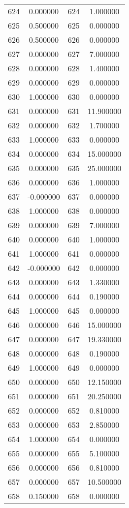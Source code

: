 \documentclass[12pt]{article}
\begin{document}
\begin{longtable}{@{}cccc@{}}
624 & 0.000000 & 624 & 1.000000 \\
625 & 0.500000 & 625 & 0.000000 \\
626 & 0.500000 & 626 & 0.000000 \\
627 & 0.000000 & 627 & 7.000000 \\
628 & 0.000000 & 628 & 1.400000 \\
629 & 0.000000 & 629 & 0.000000 \\
630 & 1.000000 & 630 & 0.000000 \\
631 & 0.000000 & 631 & 11.900000 \\
632 & 0.000000 & 632 & 1.700000 \\
633 & 1.000000 & 633 & 0.000000 \\
634 & 0.000000 & 634 & 15.000000 \\
635 & 0.000000 & 635 & 25.000000 \\
636 & 0.000000 & 636 & 1.000000 \\
637 & -0.000000 & 637 & 0.000000 \\
638 & 1.000000 & 638 & 0.000000 \\
639 & 0.000000 & 639 & 7.000000 \\
640 & 0.000000 & 640 & 1.000000 \\
641 & 1.000000 & 641 & 0.000000 \\
642 & -0.000000 & 642 & 0.000000 \\
643 & 0.000000 & 643 & 1.330000 \\
644 & 0.000000 & 644 & 0.190000 \\
645 & 1.000000 & 645 & 0.000000 \\
646 & 0.000000 & 646 & 15.000000 \\
647 & 0.000000 & 647 & 19.330000 \\
648 & 0.000000 & 648 & 0.190000 \\
649 & 1.000000 & 649 & 0.000000 \\
650 & 0.000000 & 650 & 12.150000 \\
651 & 0.000000 & 651 & 20.250000 \\
652 & 0.000000 & 652 & 0.810000 \\
653 & 0.000000 & 653 & 2.850000 \\
654 & 1.000000 & 654 & 0.000000 \\
655 & 0.000000 & 655 & 5.100000 \\
656 & 0.000000 & 656 & 0.810000 \\
657 & 0.000000 & 657 & 10.500000 \\
658 & 0.150000 & 658 & 0.000000 \\

\end{longtable}
\end{document}
